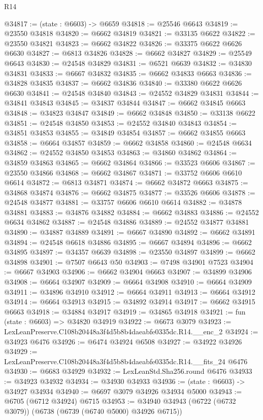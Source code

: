 \begin{lexlean}{R14}
\begin{coremodule}
@34817 := (state : @6603) -> @6659
@34818 := @25546 @6643
@34819 := @23550 @34818
@34820 := @6662 @34819
@34821 := @33135 @6622
@34822 := @23550 @34821
@34823 := @6662 @34822
@34826 := @33375 @6622 @6626 @6630
@34827 := @6813 @34826
@34828 := @6662 @34827
@34829 := @25549 @6643
@34830 := @24548 @34829
@34831 := @6521 @6639
@34832 := @34830 @34831
@34833 := @6667 @34832
@34835 := @6662 @34833 @6663
@34836 := @34828 @34835
@34837 := @6662 @34836
@34840 := @33380 @6622 @6626 @6630
@34841 := @24548 @34840
@34843 := @24552 @34829 @34831
@34844 := @34841 @34843
@34845 := @34837 @34844
@34847 := @6662 @34845 @6663
@34848 := @34823 @34847
@34849 := @6662 @34848
@34850 := @33138 @6622
@34851 := @24548 @34850
@34853 := @24552 @34840 @34843
@34854 := @34851 @34853
@34855 := @34849 @34854
@34857 := @6662 @34855 @6663
@34858 := @6664 @34857
@34859 := @6662 @34858
@34860 := @24548 @6634
@34862 := @24552 @34850 @34853
@34863 := @34860 @34862
@34864 := @34859 @34863
@34865 := @6662 @34864
@34866 := @33523 @6606
@34867 := @23550 @34866
@34868 := @6662 @34867
@34871 := @33752 @6606 @6610 @6614
@34872 := @6813 @34871
@34874 := @6662 @34872 @6663
@34875 := @34868 @34874
@34876 := @6662 @34875
@34877 := @33526 @6606
@34878 := @24548 @34877
@34881 := @33757 @6606 @6610 @6614
@34882 := @34878 @34881
@34883 := @34876 @34882
@34884 := @6662 @34883
@34886 := @24552 @6634 @34862
@34887 := @24548 @34886
@34889 := @24552 @34877 @34881
@34890 := @34887 @34889
@34891 := @6667 @34890
@34892 := @6662 @34891
@34894 := @24548 @6618 @34886
@34895 := @6667 @34894
@34896 := @6662 @34895
@34897 := @34357 @6639
@34898 := @23550 @34897
@34899 := @6662 @34898
@34901 := @7507 @6643 @50
@34903 := @7498 @34901 @7523
@34904 := @6667 @34903
@34906 := @6662 @34904 @6663
@34907 := @34899 @34906
@34908 := @6664 @34907
@34909 := @6664 @34908
@34910 := @6664 @34909
@34911 := @34896 @34910
@34912 := @6664 @34911
@34913 := @6664 @34912
@34914 := @6664 @34913
@34915 := @34892 @34914
@34917 := @6662 @34915 @6663
@34918 := @34884 @34917
@34919 := @34865 @34918
@34921 := fun (state : @6603) => @34820 @34919
@34922 := @6673 @3079
@34923 := LexLeanPreserve.C108b20448a3f4d5b8b4daeabfe0335dc.R14.__enc_2
@34924 := @34923 @6476
@34926 := @6474 @34924 @6508
@34927 := @34922 @34926
@34929 := LexLeanPreserve.C108b20448a3f4d5b8b4daeabfe0335dc.R14.__fits_24 @6476
@34930 := @6683 @34929
@34932 := LexLeanStd.Sha256.round @6476
@34933 := @34923 @34932
@34934 := @34930 @34933
@34936 := (state : @6603) -> @34927 @34934
@34940 := @6697 @3079 @34926 @34934 @5000
@34943 := @6705 (@6712 @34924) @6715
@34953 := @34940 @34943 (@6722 (@6732 @3079)) (@6738 (@6739 (@6740 @5000) @34926 @6715))

\end{coremodule}
\end{lexlean}
